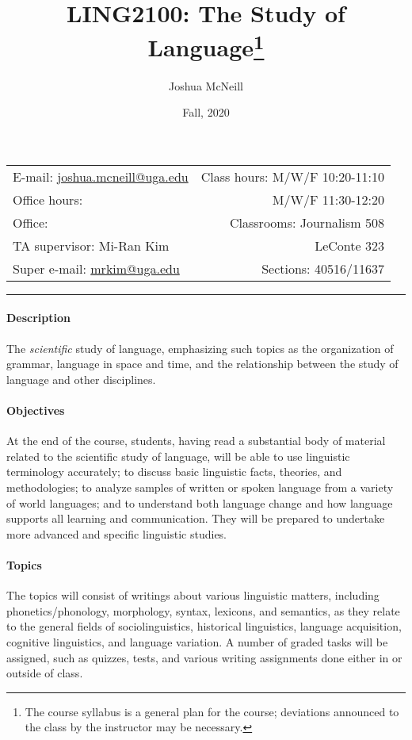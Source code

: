 \documentclass{article}
\title{LING2100: The Study of Language\footnote{The course syllabus is a general plan for the course; deviations announced to the class by the instructor may be necessary.}}
\author{Joshua McNeill}
\date{Fall, 2020}
\begin{document}
  \maketitle

  \begin{center}
    \begin{tabular}{@{} l r @{}}
      E-mail: \url{joshua.mcneill@uga.edu}              & Class hours: M/W/F 10:20-11:10\\
      Office hours:   & M/W/F 11:30-12:20\\
      Office:      & Classrooms: Journalism 508\\
      TA supervisor: Mi-Ran Kim                         & LeConte 323\\
      Super e-mail: \url{mrkim@uga.edu}                 & Sections: 40516/11637
    \end{tabular}
  \end{center}

  \hrule

  \paragraph{Description}
    The \emph{scientific} study of language, emphasizing such topics as the organization of grammar, language in space and time, and the relationship between the study of language and other disciplines.

  \paragraph{Objectives}
    At the end of the course, students, having read a substantial body of material related to the scientific study of language, will be able to use linguistic terminology accurately; to discuss basic linguistic facts, theories, and methodologies; to analyze samples of written or spoken language from a variety of world languages; and to understand both language change and how language supports all learning and communication. They will be prepared to undertake more advanced and specific linguistic studies.

  \paragraph{Topics}
    The topics will consist of writings about various linguistic matters, including phonetics/phonology, morphology, syntax, lexicons, and semantics, as they relate to the general fields of sociolinguistics, historical linguistics, language acquisition, cognitive linguistics, and language variation. A number of graded tasks will be assigned, such as quizzes, tests, and various writing assignments done either in or outside of class.
\end{document}
